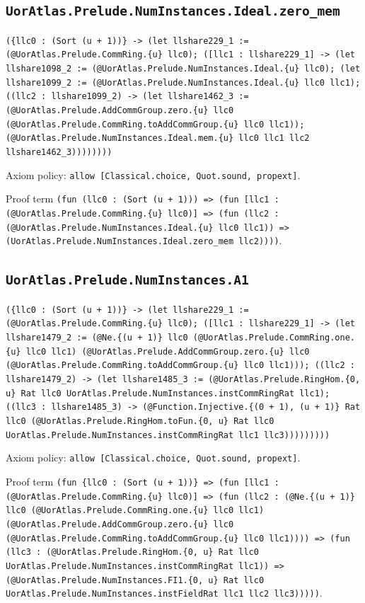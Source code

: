 \documentclass[11pt]{article}
\begin{document}
\subsection*{\texttt{UorAtlas.Prelude.NumInstances.Ideal.zero\_mem}}
\noindent\texttt{(\{llc0 : (Sort (u + 1))\} -> (let llshare229\_1 := (@UorAtlas.Prelude.CommRing.\{u\} llc0); ([llc1 : llshare229\_1] -> (let llshare1098\_2 := (@UorAtlas.Prelude.NumInstances.Ideal.\{u\} llc0); (let llshare1099\_2 := (@UorAtlas.Prelude.NumInstances.Ideal.\{u\} llc0 llc1); ((llc2 : llshare1099\_2) -> (let llshare1462\_3 := (@UorAtlas.Prelude.AddCommGroup.zero.\{u\} llc0 (@UorAtlas.Prelude.CommRing.toAddCommGroup.\{u\} llc0 llc1)); (@UorAtlas.Prelude.NumInstances.Ideal.mem.\{u\} llc0 llc1 llc2 llshare1462\_3))))))))}\par
\noindent Axiom policy: \texttt{allow [Classical.choice, Quot.sound, propext]}.\par
\noindent Proof term \texttt{(fun (llc0 : (Sort (u + 1))) => (fun [llc1 : (@UorAtlas.Prelude.CommRing.\{u\} llc0)] => (fun (llc2 : (@UorAtlas.Prelude.NumInstances.Ideal.\{u\} llc0 llc1)) => (UorAtlas.Prelude.NumInstances.Ideal.zero\_mem llc2))))}.\par
\subsection*{\texttt{UorAtlas.Prelude.NumInstances.A1}}
\noindent\texttt{(\{llc0 : (Sort (u + 1))\} -> (let llshare229\_1 := (@UorAtlas.Prelude.CommRing.\{u\} llc0); ([llc1 : llshare229\_1] -> (let llshare1479\_2 := (@Ne.\{(u + 1)\} llc0 (@UorAtlas.Prelude.CommRing.one.\{u\} llc0 llc1) (@UorAtlas.Prelude.AddCommGroup.zero.\{u\} llc0 (@UorAtlas.Prelude.CommRing.toAddCommGroup.\{u\} llc0 llc1))); ((llc2 : llshare1479\_2) -> (let llshare1485\_3 := (@UorAtlas.Prelude.RingHom.\{0, u\} Rat llc0 UorAtlas.Prelude.NumInstances.instCommRingRat llc1); ((llc3 : llshare1485\_3) -> (@Function.Injective.\{(0 + 1), (u + 1)\} Rat llc0 (@UorAtlas.Prelude.RingHom.toFun.\{0, u\} Rat llc0 UorAtlas.Prelude.NumInstances.instCommRingRat llc1 llc3)))))))))}\par
\noindent Axiom policy: \texttt{allow [Classical.choice, Quot.sound, propext]}.\par
\noindent Proof term \texttt{(fun \{llc0 : (Sort (u + 1))\} => (fun [llc1 : (@UorAtlas.Prelude.CommRing.\{u\} llc0)] => (fun (llc2 : (@Ne.\{(u + 1)\} llc0 (@UorAtlas.Prelude.CommRing.one.\{u\} llc0 llc1) (@UorAtlas.Prelude.AddCommGroup.zero.\{u\} llc0 (@UorAtlas.Prelude.CommRing.toAddCommGroup.\{u\} llc0 llc1)))) => (fun (llc3 : (@UorAtlas.Prelude.RingHom.\{0, u\} Rat llc0 UorAtlas.Prelude.NumInstances.instCommRingRat llc1)) => (@UorAtlas.Prelude.NumInstances.FI1.\{0, u\} Rat llc0 UorAtlas.Prelude.NumInstances.instFieldRat llc1 llc2 llc3)))))}.\par
\end{document}
